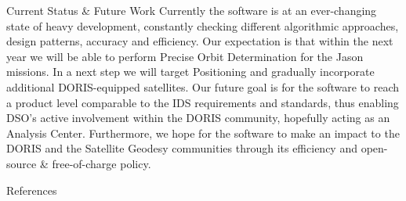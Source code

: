 \documentclass[final,a0,portrait]{beamer}
\newlength{\onecolwid}
\begin{document}
\begin{frame}[t]
\begin{columns}[t]
\begin{column}{\onecolwid}
\begin{block}{}
\end{block}

\begin{block}{Current Status \& Future Work}
{\small
Currently the software is at an ever-changing state of heavy development, 
constantly checking different algorithmic approaches, design patterns, accuracy 
and efficiency. Our expectation is that within the next year we will be able 
to perform Precise Orbit Determination for the Jason missions. In a next step 
we will target Positioning and gradually incorporate additional DORIS-equipped 
satellites. Our future goal is for the software to reach a product level 
comparable to the IDS requirements and standards, thus enabling DSO's active 
involvement within the DORIS community, hopefully acting as an Analysis Center.
Furthermore, we hope for the software to make an impact to the DORIS and the 
Satellite Geodesy communities through its efficiency and open-source \& free-of-charge 
policy.
}
\end{block}


\begin{block}{References}

\nocite{*} %
\footnotesize{
\vspace{0.75in}}


\end{block}




\end{column} %

\end{columns} %

\end{frame} %
\end{document}
